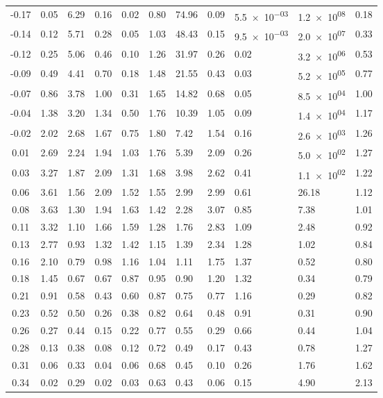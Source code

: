 {\begin{longtable}[c]{c|llllllllll}
    -0.17 & 0.05 & 6.29 & 0.16 & 0.02 & 0.80 & 74.96 & 0.09 & \num{5.5e-03} & \num{1.2e+08} & 0.18 \\
    -0.14 & 0.12 & 5.71 & 0.28 & 0.05 & 1.03 & 48.43 & 0.15 & \num{9.5e-03} & \num{2.0e+07} & 0.33 \\
    -0.12 & 0.25 & 5.06 & 0.46 & 0.10 & 1.26 & 31.97 & 0.26 & 0.02 & \num{3.2e+06} & 0.53 \\
    -0.09 & 0.49 & 4.41 & 0.70 & 0.18 & 1.48 & 21.55 & 0.43 & 0.03 & \num{5.2e+05} & 0.77 \\
    -0.07 & 0.86 & 3.78 & 1.00 & 0.31 & 1.65 & 14.82 & 0.68 & 0.05 & \num{8.5e+04} & 1.00 \\
    -0.04 & 1.38 & 3.20 & 1.34 & 0.50 & 1.76 & 10.39 & 1.05 & 0.09 & \num{1.4e+04} & 1.17 \\
    -0.02 & 2.02 & 2.68 & 1.67 & 0.75 & 1.80 & 7.42 & 1.54 & 0.16 & \num{2.6e+03} & 1.26 \\
    0.01 & 2.69 & 2.24 & 1.94 & 1.03 & 1.76 & 5.39 & 2.09 & 0.26 & \num{5.0e+02} & 1.27 \\
    0.03 & 3.27 & 1.87 & 2.09 & 1.31 & 1.68 & 3.98 & 2.62 & 0.41 & \num{1.1e+02} & 1.22 \\
    0.06 & 3.61 & 1.56 & 2.09 & 1.52 & 1.55 & 2.99 & 2.99 & 0.61 & 26.18 & 1.12 \\
    0.08 & 3.63 & 1.30 & 1.94 & 1.63 & 1.42 & 2.28 & 3.07 & 0.85 & 7.38 & 1.01 \\
    0.11 & 3.32 & 1.10 & 1.66 & 1.59 & 1.28 & 1.76 & 2.83 & 1.09 & 2.48 & 0.92 \\
    0.13 & 2.77 & 0.93 & 1.32 & 1.42 & 1.15 & 1.39 & 2.34 & 1.28 & 1.02 & 0.84 \\
    0.16 & 2.10 & 0.79 & 0.98 & 1.16 & 1.04 & 1.11 & 1.75 & 1.37 & 0.52 & 0.80 \\
    0.18 & 1.45 & 0.67 & 0.67 & 0.87 & 0.95 & 0.90 & 1.20 & 1.32 & 0.34 & 0.79 \\
    0.21 & 0.91 & 0.58 & 0.43 & 0.60 & 0.87 & 0.75 & 0.77 & 1.16 & 0.29 & 0.82 \\
    0.23 & 0.52 & 0.50 & 0.26 & 0.38 & 0.82 & 0.64 & 0.48 & 0.91 & 0.31 & 0.90 \\
    0.26 & 0.27 & 0.44 & 0.15 & 0.22 & 0.77 & 0.55 & 0.29 & 0.66 & 0.44 & 1.04 \\
    0.28 & 0.13 & 0.38 & 0.08 & 0.12 & 0.72 & 0.49 & 0.17 & 0.43 & 0.78 & 1.27 \\
    0.31 & 0.06 & 0.33 & 0.04 & 0.06 & 0.68 & 0.45 & 0.10 & 0.26 & 1.76 & 1.62 \\
    0.34 & 0.02 & 0.29 & 0.02 & 0.03 & 0.63 & 0.43 & 0.06 & 0.15 & 4.90 & 2.13 \\

\end{longtable}}
